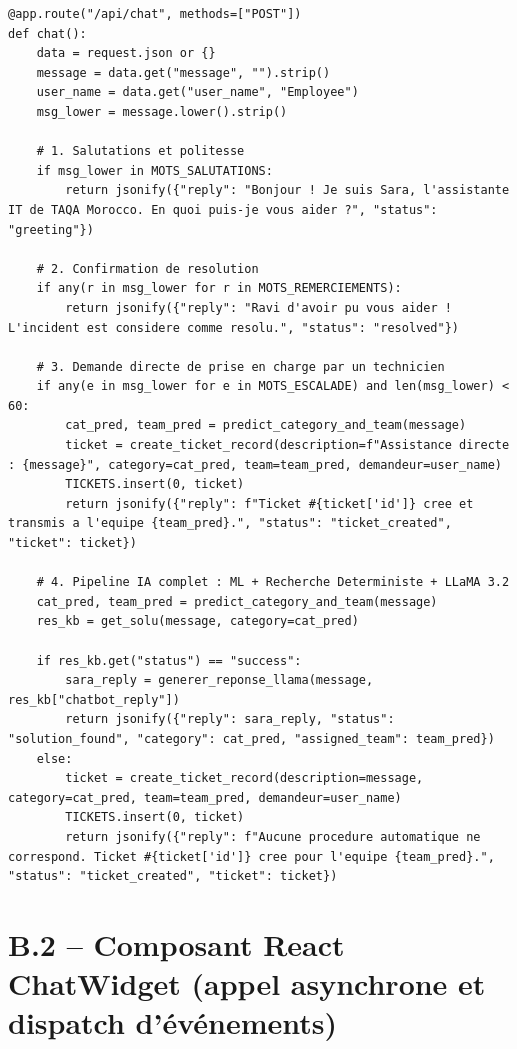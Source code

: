 \documentclass[12pt, a4paper, oneside]{report}
\begin{document}
\begin{lstlisting}[style=python,
  caption={Logique d'aiguillage et de dialogue de l'endpoint /api/chat}]
@app.route("/api/chat", methods=["POST"])
def chat():
    data = request.json or {}
    message = data.get("message", "").strip()
    user_name = data.get("user_name", "Employee")
    msg_lower = message.lower().strip()

    # 1. Salutations et politesse
    if msg_lower in MOTS_SALUTATIONS:
        return jsonify({"reply": "Bonjour ! Je suis Sara, l'assistante IT de TAQA Morocco. En quoi puis-je vous aider ?", "status": "greeting"})

    # 2. Confirmation de resolution
    if any(r in msg_lower for r in MOTS_REMERCIEMENTS):
        return jsonify({"reply": "Ravi d'avoir pu vous aider ! L'incident est considere comme resolu.", "status": "resolved"})

    # 3. Demande directe de prise en charge par un technicien
    if any(e in msg_lower for e in MOTS_ESCALADE) and len(msg_lower) < 60:
        cat_pred, team_pred = predict_category_and_team(message)
        ticket = create_ticket_record(description=f"Assistance directe : {message}", category=cat_pred, team=team_pred, demandeur=user_name)
        TICKETS.insert(0, ticket)
        return jsonify({"reply": f"Ticket #{ticket['id']} cree et transmis a l'equipe {team_pred}.", "status": "ticket_created", "ticket": ticket})

    # 4. Pipeline IA complet : ML + Recherche Deterministe + LLaMA 3.2
    cat_pred, team_pred = predict_category_and_team(message)
    res_kb = get_solu(message, category=cat_pred)

    if res_kb.get("status") == "success":
        sara_reply = generer_reponse_llama(message, res_kb["chatbot_reply"])
        return jsonify({"reply": sara_reply, "status": "solution_found", "category": cat_pred, "assigned_team": team_pred})
    else:
        ticket = create_ticket_record(description=message, category=cat_pred, team=team_pred, demandeur=user_name)
        TICKETS.insert(0, ticket)
        return jsonify({"reply": f"Aucune procedure automatique ne correspond. Ticket #{ticket['id']} cree pour l'equipe {team_pred}.", "status": "ticket_created", "ticket": ticket})
\end{lstlisting}

\section*{B.2 -- Composant React ChatWidget (appel asynchrone et dispatch d'événements)}
\end{document}

